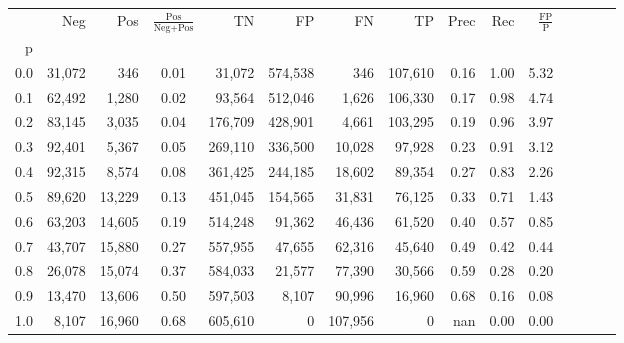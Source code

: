 \begin{tabular}{rrrcrrrrrrrrrrr}
\toprule
{} &     Neg &     Pos & $\frac{\text{Pos}}{\text{Neg}+\text{Pos}}$ &       TN &       FP &       FN &       TP &  Prec &   Rec & $\frac{\text{FP}}{\text{P}}$ \\
p   &         &         &                                            &          &          &          &          &       &       &                              \\
\midrule
0.0 &  31,072 &     346 &                                       0.01 &   31,072 &  574,538 &      346 &  107,610 &  0.16 &  1.00 &                         5.32 \\
0.1 &  62,492 &   1,280 &                                       0.02 &   93,564 &  512,046 &    1,626 &  106,330 &  0.17 &  0.98 &                         4.74 \\
0.2 &  83,145 &   3,035 &                                       0.04 &  176,709 &  428,901 &    4,661 &  103,295 &  0.19 &  0.96 &                         3.97 \\
0.3 &  92,401 &   5,367 &                                       0.05 &  269,110 &  336,500 &   10,028 &   97,928 &  0.23 &  0.91 &                         3.12 \\
0.4 &  92,315 &   8,574 &                                       0.08 &  361,425 &  244,185 &   18,602 &   89,354 &  0.27 &  0.83 &                         2.26 \\
0.5 &  89,620 &  13,229 &                                       0.13 &  451,045 &  154,565 &   31,831 &   76,125 &  0.33 &  0.71 &                         1.43 \\
0.6 &  63,203 &  14,605 &                                       0.19 &  514,248 &   91,362 &   46,436 &   61,520 &  0.40 &  0.57 &                         0.85 \\
0.7 &  43,707 &  15,880 &                                       0.27 &  557,955 &   47,655 &   62,316 &   45,640 &  0.49 &  0.42 &                         0.44 \\
0.8 &  26,078 &  15,074 &                                       0.37 &  584,033 &   21,577 &   77,390 &   30,566 &  0.59 &  0.28 &                         0.20 \\
0.9 &  13,470 &  13,606 &                                       0.50 &  597,503 &    8,107 &   90,996 &   16,960 &  0.68 &  0.16 &                         0.08 \\
1.0 &   8,107 &  16,960 &                                       0.68 &  605,610 &        0 &  107,956 &        0 &   nan &  0.00 &                         0.00 \\
\bottomrule
\end{tabular}
